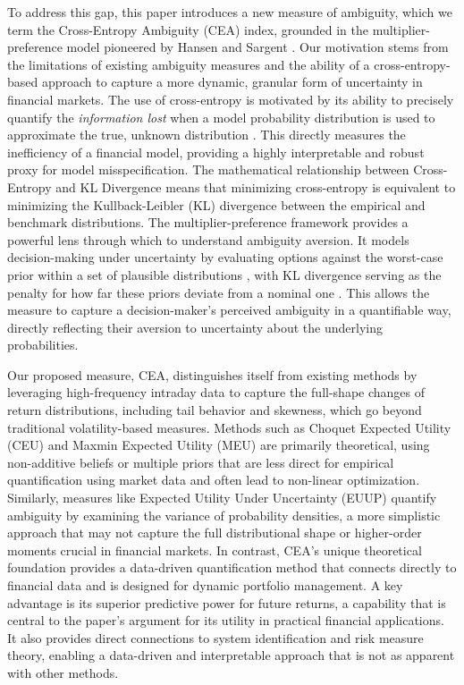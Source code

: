 \documentclass[preprint,12pt,authoryear]{elsarticle}
\begin{document}
To address this gap, this paper introduces a new measure of ambiguity, which we term the Cross-Entropy Ambiguity (CEA) index, grounded in the multiplier-preference model pioneered by Hansen and Sargent \cite{hansen2001}. Our motivation stems from the limitations of existing ambiguity measures and the ability of a cross-entropy-based approach to capture a more dynamic, granular form of uncertainty in financial markets. The use of cross-entropy is motivated by its ability to precisely quantify the \textit{information lost} when a model probability distribution is used to approximate the true, unknown distribution \cite{klibanoff2005}. This directly measures the inefficiency of a financial model, providing a highly interpretable and robust proxy for model misspecification. The mathematical relationship between Cross-Entropy and KL Divergence \cite{mackay2003information} means that minimizing cross-entropy is equivalent to minimizing the Kullback-Leibler (KL) divergence between the empirical and benchmark distributions. The multiplier-preference framework \cite{epstein2008} provides a powerful lens through which to understand ambiguity aversion. It models decision-making under uncertainty by evaluating options against the worst-case prior within a set of plausible distributions \cite{maccheroni2006}, with KL divergence serving as the penalty for how far these priors deviate from a nominal one \cite{epstein2008}. This allows the measure to capture a decision-maker's perceived ambiguity in a quantifiable way, directly reflecting their aversion to uncertainty about the underlying probabilities. 

Our proposed measure, CEA, distinguishes itself from existing methods by leveraging high-frequency intraday data to capture the full-shape changes of return distributions, including tail behavior and skewness, which go beyond traditional volatility-based measures. Methods such as Choquet Expected Utility (CEU)  and Maxmin Expected Utility (MEU)  are primarily theoretical, using non-additive beliefs or multiple priors that are less direct for empirical quantification using market data and often lead to non-linear optimization. Similarly, measures like Expected Utility Under Uncertainty (EUUP)  quantify ambiguity by examining the variance of probability densities, a more simplistic approach that may not capture the full distributional shape or higher-order moments crucial in financial markets. In contrast, CEA’s unique theoretical foundation provides a data-driven quantification method that connects directly to financial data and is designed for dynamic portfolio management. A key advantage is its superior predictive power for future returns, a capability that is central to the paper’s argument for its utility in practical financial applications. It also provides direct connections to system identification and risk measure theory, enabling a data-driven and interpretable approach that is not as apparent with other methods.
\end{document}
